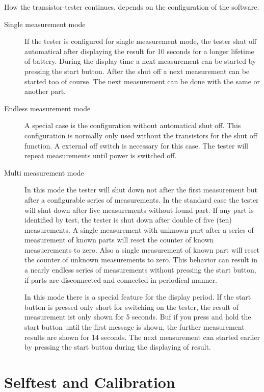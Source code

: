 How the transistor-tester continues, depends on the configuration of the software.
\begin{description}
  \item[Single measurement mode] If the tester is configured for single measurement mode, the tester shut off automatical after displaying the
result for 10 seconds for a longer lifetime of battery. 
During the display time a next measurement can be started by pressing the start button.
After the shut off a next measurement can be started too of course.
The next measurement can be done with the same or another part.

  \item[Endless measurement mode] A special case is the configuration without automatical shut off.
This configuration is normally only used without the transistors for the shut off function.
A external off switch is necessary for this case. The tester will repeat measurements until power
is switched off.

  \item[Multi measurement mode] In this mode the tester will shut down not after the first measurement but 
after a configurable series of measurements. In the standard case the tester will shut down after five
measurements without found part. If any part is identified by test, the tester is shut down after double of
five (ten) measurements. A single measurement with unknown part after a series of measurement of known parts will
reset the counter of known measuerements to zero. Also a single measurement of known part will reset the counter
of unknown measurements to zero. This behavior can result in a nearly endless series of measurements without
pressing the start button, if parts are disconnected and connected in periodical manner.

In this mode there is a special feature for the display period. If the start button is pressed only short for switching
on the tester, the result of measurement ist only shown for 5 seconds. Buf if you press and hold the start button until
the first message is shown, the further measurement results are shown for 14 seconds.
The next measurement can started earlier by pressing the start button during the displaying of result.

\end{description}

\section{Selftest and Calibration}

